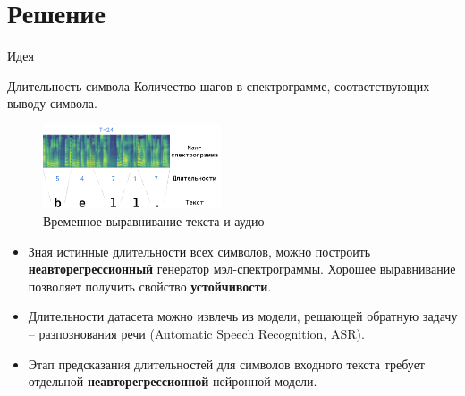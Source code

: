 \section{Решение}

\begin{frame}{Идея}
\begin{block}{Длительность символа}
    Количество шагов в спектрограмме, соответствующих выводу символа.
\end{block}
\vspace{-0.1cm}
\begin{figure}[H]
\centering
\includegraphics[width=0.47\textwidth]{images/alignment.png}
\caption{Временное выравнивание текста и аудио}
\end{figure}
\vspace{-0.4cm}
\begin{itemize}
    \item Зная истинные длительности всех символов, можно построить \textbf{неавторегрессионный} генератор мэл-спектрограммы. Хорошее выравнивание позволяет получить свойство \textbf{устойчивости}.
    \item Длительности датасета можно извлечь из модели, решающей обратную задачу -- разпознования речи (Automatic Speech Recognition, ASR).
    \item Этап предсказания длительностей для символов входного текста требует отдельной \textbf{неавторегрессионной} нейронной модели.
\end{itemize}
\end{frame}


